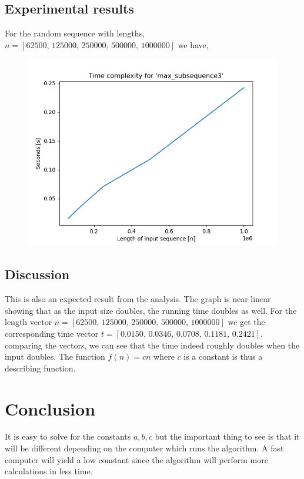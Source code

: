 \documentclass[12pt]{article}
\begin{document}
\subsection{Experimental results}
For the random sequence with lengths,
$n = [62500,\,125000,\, 250000,\, 500000,\, 1000000]$ we have,
\begin{figure}[h]
\centering
\includegraphics[scale=0.52]{ms3.png}
\end{figure}
\newpage
\subsection{Discussion}
This is also an expected result from the analysis. The graph is near linear showing that as the input size doubles, the running time doubles as well. For the length vector $n =  [62500,\,125000,\, 250000,\, 500000,\, 1000000]$ we get the corresponding time vector $ t = [0.0150,\,0.0346,\, 0.0708,\, 0.1181,\, 0.2421]$. comparing the vectors, we can see that the time indeed roughly doubles when the input doubles. The function $f(n) = cn$ where $c$ is a constant is thus a describing function.  
\section{Conclusion}
It is easy to solve for the constants $a,b,c$ but the important thing to see is that it will be different depending on the computer which runs the algorithm. A fast computer will yield a low constant since the algorithm will perform more calculations in less time.
\end{document}
